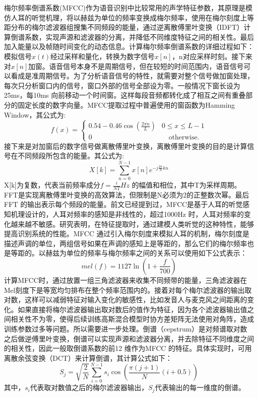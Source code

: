 梅尔频率倒谱系数(MFCC)作为语音识别中比较常用的声学特征参数，其原理是模仿人耳的听觉机理，将以赫兹为单位的频率变换成梅尔频率，使用在梅尔刻度上等距分布的梅尔滤波器组搜集不同频段的能量，通过逆离散傅里叶变换（IDFT）计算倒谱系数，实现声源和滤波器的分离，并降低不同维度特征之间的相关性。最后加入能量以及帧随时间变化的动态信息。计算梅尔频率倒谱系数的详细过程如下：模拟信号$x(t)$经过采样和量化，转换为数字信号$x[n]$，n对应采样时刻。接下来对$x[n]$加窗。语音信号本身不是周期信号，但在较短的时间范围内，语音信号可以看成是准周期信号。为了分析语音信号的特性，就需要对整个信号做加窗处理，每次只分析窗口内的信号，窗口外部的信号全部设为零。一般情况下窗长设为25ms，每10ms 向前移动一个时间窗。这样每段音频都转化成了相互之间有重叠部分的固定长度的数字向量。MFCC提取过程中普遍使用的窗函数为Hamming Window，其公式为:
\begin{equation}
  f(x)=
    \begin{cases}
      0.54 - 0.46\cos(\frac{2{\pi}n}{L}) & 0\leq x\leq L-1 \\
      \text{0} &\quad\text{otherwise.} \
    \end{cases}
\end{equation}
接下来是对加窗后的数字信号做离散傅里叶变换，离散傅里叶变换的目的是计算信号在不同频段所包含的能量。其公式为:\begin{equation}X[k]=\sum_{n=0}^{N-1} x[n]{e^{-j\frac{2\pi}{N}k{n}}}\end{equation}X[k]为复数，代表当前频率成分$f=\frac{i}{NT}Hz$ 的幅值和相位，其中T为采样周期。FFT是实现离散傅里叶变换的高效算法，但限制是N必须为2的正整数次幂。最后FFT 的输出表示每个频段的能量。前文已经提到过，MFCC是基于人耳的听觉感知机理设计的，人耳对频率的感知是非线性的，超过1000Hz 时，人耳对频率的变化越来越不敏感。研究表明，在特征提取时，通过建模人类听觉的这种特性，能够提高识别系统的性能\cite{davis1980comparison}。MFCC 通过引入梅尔刻度来模拟人耳的机制，梅尔刻度\cite{stevens1940}是描述声调的单位，两组信号如果在声调的感知上是等距的，那么它们的梅尔频率也是等距的。以赫兹为单位的频率与梅尔频率之间的关系可以使用如下公式表示：\begin{equation}mel(f)=1127\ln(1+\frac{f}{700})\end{equation}计算MFCC时，通过放置一组三角滤波器来收集不同频带的能量，三角滤波器在Mel刻度下是等宽均匀排布在整个频率范围内的。接着对每个梅尔滤波器的输出取对数，这样可以减弱特征对输入变化的敏感性，比如发音人与麦克风之间距离的变化。如果直接将梅尔滤波器输出取对数后的值作为特征，因为各个滤波器输出值之间相关性不为零，使得后续训练高斯混合模型时协方差矩阵无法使用对角阵，造成训练参数过多等问题。所以需要进一步处理。倒谱（cepstrum）是对频谱取对数之后做逆傅里叶变换，倒谱可以实现声源和滤波器分离，并去除特征不同维度之间的相关性，因此一般取倒谱系数的前12 维作为MFCC 的特征。具体实现时，可用离散余弦变换（DCT）来计算倒谱，其计算公式如下：\begin{equation}S_j=\sqrt{\frac{2}{N}}\sum_{i=0}^{N-1} s_i\cos(\frac{\pi({j+1})}{N}(i+0.5))\end{equation}其中，$s_i$代表取对数值之后的梅尔滤波器输出，$S_j$代表输出的每一维度的倒谱。
